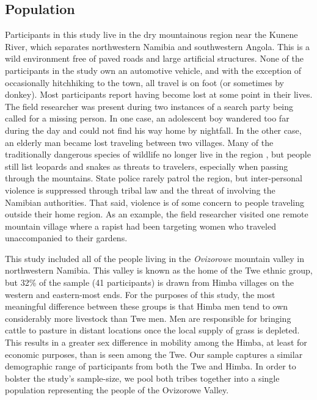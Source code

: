 	\subsection{Population}
Participants in this study live in the dry mountainous region near the Kunene River, which separates northwestern Namibia and southwestern Angola.  This is a wild environment free of paved roads and large artificial structures.  None of the participants in the study own an automotive vehicle, and with the exception of occasionally hitchhiking to the town, all travel is on foot (or sometimes by donkey).  Most participants report having become lost at some point in their lives.  The field researcher was present during two instances of a search party being called for a missing person.  In one case, an adolescent boy wandered too far during the day and could not find his way home by nightfall.  In the other case, an elderly man became lost traveling between two villages.  Many of the traditionally dangerous species of wildlife no longer live in the region \citep{viljoen1982distribution}, but people still list leopards and snakes as threats to travelers, especially when passing through the mountains.  State police rarely patrol the region, but inter-personal violence is suppressed through tribal law and the threat of involving the Namibian authorities.  That said, violence is of some concern to people traveling outside their home region.  As an example, the field researcher visited one remote mountain village where a rapist had been targeting women who traveled unaccompanied to their gardens.

This study included all of the people living in the \emph{Ovizorowe} mountain valley in northwestern Namibia.  This valley is known as the home of the Twe ethnic group, but 32\% of the sample (41 participants) is drawn from Himba villages on the western and eastern-most ends.  For the purposes of this study, the most meaningful difference between these groups is that Himba men tend to own considerably more livestock than Twe men.  Men are responsible for bringing cattle to pasture in distant locations once the local supply of grass is depleted.  This results in a greater sex difference in mobility among the Himba, at least for economic purposes, than is seen among the Twe.  Our sample captures a similar demographic range of participants from both the Twe and Himba.  In order to bolster the study's sample-size, we pool both tribes together into a single population representing the people of the Ovizorowe Valley.

